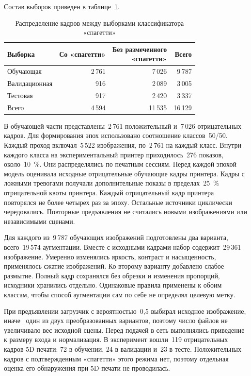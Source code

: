 Состав выборок приведен в таблице~\ref{tab:spaghetti-v5-splits}.
\begin{table}[h!]
  \caption{Распределение кадров между выборками классификатора «спагетти»}
  \label{tab:spaghetti-v5-splits}
  \centering
  \begin{tabular}{|l|r|r|r|}
    \hline
    Выборка & Со «спагетти» & \makecell{Без размеченного\\«спагетти»} & Всего \\ \hline
    Обучающая & 2\,761 & 7\,026 & 9\,787 \\ \hline
    Валидационная & 916 & 2\,089 & 3\,005 \\ \hline
    Тестовая & 917 & 2\,420 & 3\,337 \\ \hline
    Всего & 4\,594 & 11\,535 & 16\,129 \\ \hline
  \end{tabular}
\end{table}

В обучающей части представлены~2\,761 положительный и~7\,026 отрицательных кадров. Для формирования эпох использовано соотношение классов~50/50. Каждый проход включал~5\,522 изображения, по~2\,761 на каждый класс. Внутри каждого класса на экспериментальный принтер приходилось~276 показов, около~10~\%. Они распределялись по печатным сессиям. Перед каждой эпохой модель оценивала исходные отрицательные обучающие кадры принтера. Кадры с ложными тревогами получали дополнительные показы в пределах~25~\% отрицательной квоты принтера. Каждый отрицательный кадр принтера повторялся не более четырех раз за эпоху. Остальные источники циклически чередовались. Повторные предъявления не считались новыми изображениями или независимыми сценами.

Для каждого из~9\,787 обучающих изображений подготовлены два варианта, всего~19\,574 аугментации. Вместе с исходными кадрами набор содержит~29\,361 изображение. Умеренно изменялись яркость, контраст и насыщенность, применялось сжатие изображений. Ко второму варианту добавлено слабое размытие. Полный кадр сохранялся без обрезки и изменения пропорций, исходники хранились отдельно. Одинаковые правила применены к обоим классам, чтобы способ аугментации сам по себе не определял целевую метку.

При предъявлении загрузчик с вероятностью~0,5 выбирал исходное изображение, иначе~\textemdash{} один из двух преобразованных вариантов, поэтому число файлов не увеличивало вес исходной сцены. Перед подачей в сеть выполнялись приведение к размеру входа и нормализация. В эксперимент вошли~119 отрицательных кадров 5D-печати: 72 в обучении, 24 в валидации и~23 в тесте. Положительных кадров с подтвержденным «спагетти» этого режима нет, поэтому отдельная оценка его обнаружения при 5D-печати не проводилась.

